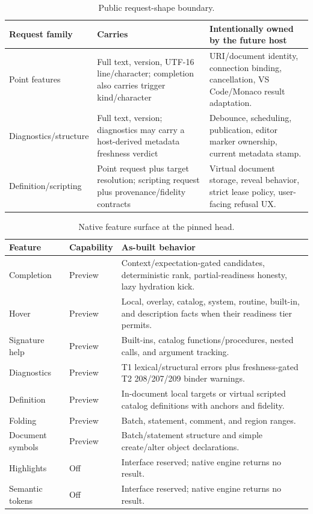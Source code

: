 \documentclass[11pt]{article}
\newcommand{\code}[1]{\texttt{\detokenize{#1}}}
\begin{document}
\begin{table}[H]
\centering
\small
\caption{Public request-shape boundary.}
\label{tab:request-shapes}
\begin{tabularx}{\textwidth}{@{}p{}p{}X@{}}
\toprule
\textbf{Request family} & \textbf{Carries} & \textbf{Intentionally owned by the future host}\\
\midrule
Point features & Full text, version, UTF-16 line/character; completion also carries trigger kind/character & URI/document identity, connection binding, cancellation, VS Code/Monaco result adaptation.\\
Diagnostics/structure & Full text, version; diagnostics may carry a host-derived metadata freshness verdict & Debounce, scheduling, publication, editor marker ownership, current metadata stamp.\\
Definition/scripting & Point request plus target resolution; scripting request plus provenance/fidelity contracts & Virtual document storage, reveal behavior, strict lease policy, user-facing refusal UX.\\
\bottomrule
\end{tabularx}
\end{table}

\begin{table}[H]
\centering
\small
\caption{Native feature surface at the pinned head.}
\label{tab:features}
\begin{tabularx}{\textwidth}{@{}p{}p{}X@{}}
\toprule
\textbf{Feature} & \textbf{Capability} & \textbf{As-built behavior}\\
\midrule
Completion & Preview & Context/expectation-gated candidates, deterministic rank, partial-readiness honesty, lazy hydration kick.\\
Hover & Preview & Local, overlay, catalog, system, routine, built-in, and description facts when their readiness tier permits.\\
Signature help & Preview & Built-ins, catalog functions/procedures, nested calls, and \code{EXEC} argument tracking.\\
Diagnostics & Preview & T1 lexical/structural errors plus freshness-gated T2 208/207/209 binder warnings.\\
Definition & Preview & In-document local targets or virtual scripted catalog definitions with anchors and fidelity.\\
Folding & Preview & Batch, statement, comment, and region ranges.\\
Document symbols & Preview & Batch/statement structure and simple create/alter object declarations.\\
Highlights & Off & Interface reserved; native engine returns no result.\\
Semantic tokens & Off & Interface reserved; native engine returns no result.\\
\bottomrule
\end{tabularx}
\end{table}
\end{document}

